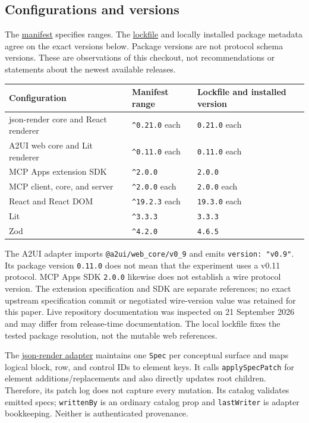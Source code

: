 \documentclass[11pt]{article}
\newcounter{none}
\begin{document}
\subsection{Configurations and
versions}\label{configurations-and-versions}

The \href{../package.json}{manifest} specifies ranges. The
\href{../package-lock.json}{lockfile} and locally installed package
metadata agree on the exact versions below. Package versions are not
protocol schema versions. These are observations of this checkout, not
recommendations or statements about the newest available releases.

{\def\LTcaptype{none} %
\begin{longtable}[]{@{}lll@{}}
\toprule\noalign{}
Configuration & Manifest range & Lockfile and installed version \\
\midrule\noalign{}
\endhead
\bottomrule\noalign{}
\endlastfoot
json-render core and React renderer & \texttt{\^{}0.21.0} each &
\texttt{0.21.0} each \\
A2UI web core and Lit renderer & \texttt{\^{}0.11.0} each &
\texttt{0.11.0} each \\
MCP Apps extension SDK & \texttt{\^{}2.0.0} & \texttt{2.0.0} \\
MCP client, core, and server & \texttt{\^{}2.0.0} each & \texttt{2.0.0}
each \\
React and React DOM & \texttt{\^{}19.2.3} each & \texttt{19.3.0} each \\
Lit & \texttt{\^{}3.3.3} & \texttt{3.3.3} \\
Zod & \texttt{\^{}4.2.0} & \texttt{4.6.5} \\
\end{longtable}
}

The A2UI adapter imports \texttt{@a2ui/web\_core/v0\_9} and emits
\texttt{version:\ "v0.9"}. Its package version \texttt{0.11.0} does not
mean that the experiment uses a v0.11 protocol. MCP Apps SDK
\texttt{2.0.0} likewise does not establish a wire protocol version. The
extension specification and SDK are separate references; no exact
upstream specification commit or negotiated wire-version value was
retained for this paper. Live repository documentation was inspected on
21 September 2026 and may differ from release-time documentation. The
local lockfile fixes the tested package resolution, not the mutable web
references.

The \href{../src/adapters/json-render/adapter.ts}{json-render adapter}
maintains one \texttt{Spec} per conceptual surface and maps logical
block, row, and control IDs to element keys. It calls
\texttt{applySpecPatch} for element additions/replacements and also
directly updates root children. Therefore, its patch log does not
capture every mutation. Its catalog validates emitted specs;
\texttt{writtenBy} is an ordinary catalog prop and \texttt{lastWriter}
is adapter bookkeeping. Neither is authenticated provenance.
\end{document}

